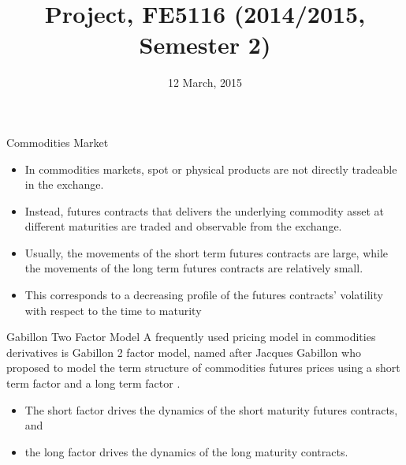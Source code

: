 \documentclass[11pt]{beamer}
\title{Project, FE5116 (2014/2015, Semester 2)}
\date{12 March, 2015}
\begin{document}
\begin{frame}
\titlepage
\end{frame}


\begin{frame}{Commodities Market}

\begin{itemize}
\item In commodities markets, spot or physical products are not directly tradeable in the exchange.
\item Instead, futures contracts that delivers the underlying commodity asset at different maturities are traded and observable from the exchange.
\item Usually, the movements of the short term futures contracts are large, while the movements of the long term futures contracts are relatively small.
\item This corresponds to a decreasing profile of the futures contracts' volatility with respect to the time to maturity
\end{itemize}

\end{frame}

\begin{frame}{Gabillon Two Factor Model}
A frequently used pricing model in commodities derivatives is Gabillon 2 factor model, named after Jacques Gabillon who proposed to model the term structure of commodities futures prices using a short term factor and a long term factor \cite{gabillon1991, schwartz1997, Clewlow99valuingenergy}.
\begin{itemize}
\item The short factor drives the dynamics of the short maturity futures contracts, and
\item the long factor drives the dynamics of the long maturity contracts.
\end{itemize}

\end{frame}
\end{document}
